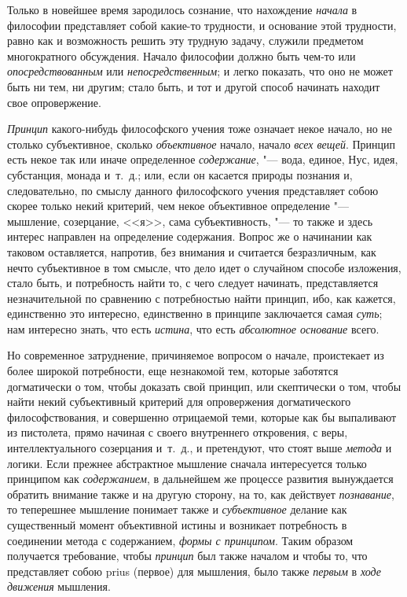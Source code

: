 Только в новейшее время зародилось сознание, что
нахождение {\em начала} в философии представляет собой
какие-то трудности, и основание этой трудности, равно как и возможность
решить эту трудную задачу, служили предметом многократного обсуждения.
Начало философии должно быть чем-то или {\em опосредствованным} или
{\em непосредственным}; и легко показать, что оно не
может быть ни тем, ни другим; стало быть, и тот и другой способ начинать
находит свое опровержение.

{\em Принцип} какого-нибудь философского учения тоже
означает некое начало, но не столько субъективное, сколько
{\em объективное} начало, начало
{\em всех вещей}. Принцип есть некое так или иначе
определенное {\em содержание}, "--- вода, единое, Нус,
идея, субстанция, монада
и~т.~д.; или, если он касается природы познания и, следовательно, по смыслу
данного философского учения представляет собою скорее только некий
критерий, чем некое объективное определение "--- мышление, созерцание, <<я>>,
сама субъективность, "--- то также и здесь интерес направлен на определение
содержания. Вопрос же о начинании как таковом оставляется, напротив, без
внимания и считается безразличным, как нечто субъективное в том смысле, что
дело идет о случайном способе изложения, стало быть, и потребность найти
то, с чего следует начинать, представляется незначительной по сравнению с
потребностью найти принцип, ибо, как кажется, единственно это интересно,
единственно в принципе заключается самая {\em суть};
нам интересно знать, что есть {\em истина}, что есть
{\em абсолютное основание} всего.

Но современное затруднение, причиняемое вопросом о начале, проистекает из
более широкой потребности, еще незнакомой тем, которые заботятся
догматически о том, чтобы доказать свой принцип, или скептически о том,
чтобы найти некий субъективный критерий для опровержения догматического
философствования, и совершенно отрицаемой теми, которые как бы выпаливают
из пистолета, прямо начиная с своего внутреннего откровения, с веры,
интеллектуального созерцания и~т.~д., и претендуют, что стоят выше
{\em метода} и логики. Если прежнее абстрактное
мышление сначала интересуется только принципом как
{\em содержанием}, в дальнейшем же процессе развития
вынуждается обратить внимание также и на другую сторону, на то, как
действует {\em познавание}, то теперешнее мышление
понимает также и {\em субъективное} делание как
существенный момент объективной истины и возникает потребность в соединении
метода с содержанием, {\em формы с принципом}. Таким
образом получается требование, чтобы {\em принцип} был
также началом и чтобы то, что представляет собою prius (первое) для
мышления, было также {\em первым} в {\em ходе движения} мышления.

